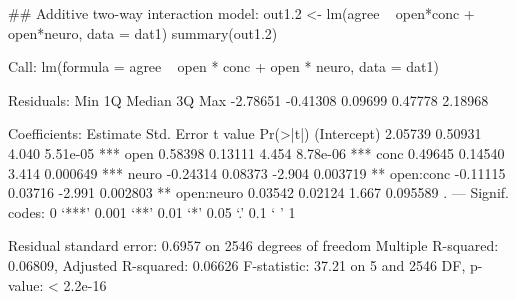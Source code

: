 \begin{Schunk}
\begin{Sinput}
 ## Additive two-way interaction model:
 out1.2 <- lm(agree ~ open*conc + open*neuro, data = dat1)
 summary(out1.2)
\end{Sinput}
\begin{Soutput}
Call:
lm(formula = agree ~ open * conc + open * neuro, data = dat1)

Residuals:
     Min       1Q   Median       3Q      Max 
-2.78651 -0.41308  0.09699  0.47778  2.18968 

Coefficients:
            Estimate Std. Error t value Pr(>|t|)    
(Intercept)  2.05739    0.50931   4.040 5.51e-05 ***
open         0.58398    0.13111   4.454 8.78e-06 ***
conc         0.49645    0.14540   3.414 0.000649 ***
neuro       -0.24314    0.08373  -2.904 0.003719 ** 
open:conc   -0.11115    0.03716  -2.991 0.002803 ** 
open:neuro   0.03542    0.02124   1.667 0.095589 .  
---
Signif. codes:  0 ‘***’ 0.001 ‘**’ 0.01 ‘*’ 0.05 ‘.’ 0.1 ‘ ’ 1

Residual standard error: 0.6957 on 2546 degrees of freedom
Multiple R-squared:  0.06809,	Adjusted R-squared:  0.06626 
F-statistic: 37.21 on 5 and 2546 DF,  p-value: < 2.2e-16
\end{Soutput}
\end{Schunk}
